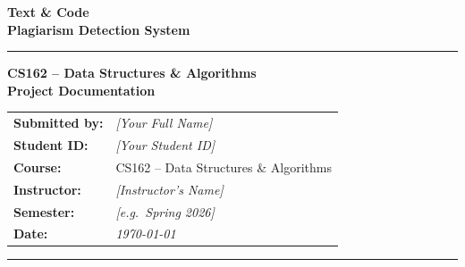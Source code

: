 \documentclass[12pt,a4paper]{article}
\begin{document}
\onehalfspacing

\thispagestyle{empty}
\begin{center}

  \vspace*{1cm}

  \vspace{1.0cm}
  {\Huge\bfseries\color{primaryblue}
    Text \& Code\\[0.3cm] Plagiarism Detection System}

  \vspace{0.4cm}
  \color{accentblue}\rule{0.65\textwidth}{1.5pt}\color{black}

  \vspace{0.5cm}
  {\large\bfseries CS162 – Data Structures \& Algorithms\\[0.2cm]
   Project Documentation}

  \vspace{1.0cm}
  \begin{tabular}{ll}
    \textbf{Submitted by:} & \textit{[Your Full Name]}             \\[4pt]
    \textbf{Student ID:}   & \textit{[Your Student ID]}            \\[4pt]
    \textbf{Course:}       & CS162 – Data Structures \& Algorithms \\[4pt]
    \textbf{Instructor:}   & \textit{[Instructor's Name]}          \\[4pt]
    \textbf{Semester:}     & \textit{[e.g.\ Spring 2026]}          \\[4pt]
    \textbf{Date:}         & \textit{\today}
  \end{tabular}

  \vspace{1.2cm}
  \color{accentblue}\rule{0.65\textwidth}{1.5pt}
\end{center}
\end{document}
